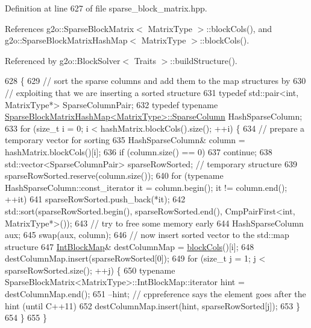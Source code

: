 Definition at line 627 of file sparse\+\_\+block\+\_\+matrix.\+hpp.



References g2o\+::\+Sparse\+Block\+Matrix$<$ Matrix\+Type $>$\+::block\+Cols(), and g2o\+::\+Sparse\+Block\+Matrix\+Hash\+Map$<$ Matrix\+Type $>$\+::block\+Cols().



Referenced by g2o\+::\+Block\+Solver$<$ Traits $>$\+::build\+Structure().


\begin{DoxyCode}
628   \{
629     \textcolor{comment}{// sort the sparse columns and add them to the map structures by}
630     \textcolor{comment}{// exploiting that we are inserting a sorted structure}
631     \textcolor{keyword}{typedef} std::pair<int, MatrixType*> SparseColumnPair;
632     \textcolor{keyword}{typedef} \textcolor{keyword}{typename} \hyperlink{classg2o_1_1SparseBlockMatrixHashMap_ae364a722296b90e32dd6c3a8fbeb49ae}{SparseBlockMatrixHashMap<MatrixType>::SparseColumn}
       HashSparseColumn;
633     \textcolor{keywordflow}{for} (\textcolor{keywordtype}{size\_t} i = 0; i < hashMatrix.blockCols().size(); ++i) \{
634       \textcolor{comment}{// prepare a temporary vector for sorting}
635       HashSparseColumn& column = hashMatrix.blockCols()[i];
636       \textcolor{keywordflow}{if} (column.size() == 0)
637         \textcolor{keywordflow}{continue};
638       std::vector<SparseColumnPair> sparseRowSorted; \textcolor{comment}{// temporary structure}
639       sparseRowSorted.reserve(column.size());
640       \textcolor{keywordflow}{for} (\textcolor{keyword}{typename} HashSparseColumn::const\_iterator it = column.begin(); it != column.end(); ++it)
641         sparseRowSorted.push\_back(*it);
642       std::sort(sparseRowSorted.begin(), sparseRowSorted.end(), CmpPairFirst<int, MatrixType*>());
643       \textcolor{comment}{// try to free some memory early}
644       HashSparseColumn aux;
645       swap(aux, column);
646       \textcolor{comment}{// now insert sorted vector to the std::map structure}
647       \hyperlink{classg2o_1_1SparseBlockMatrix_aaa6ca1ae454ed70f62992b6401645f4e}{IntBlockMap}& destColumnMap = \hyperlink{classg2o_1_1SparseBlockMatrix_a8e53797223fff106487d0b0080a3e36e}{blockCols}()[i];
648       destColumnMap.insert(sparseRowSorted[0]);
649       \textcolor{keywordflow}{for} (\textcolor{keywordtype}{size\_t} j = 1; j < sparseRowSorted.size(); ++j) \{
650         \textcolor{keyword}{typename} SparseBlockMatrix<MatrixType>::IntBlockMap::iterator hint = destColumnMap.end();
651         --hint; \textcolor{comment}{// cppreference says the element goes after the hint (until C++11)}
652         destColumnMap.insert(hint, sparseRowSorted[j]);
653       \}
654     \}
655   \}
\end{DoxyCode}
